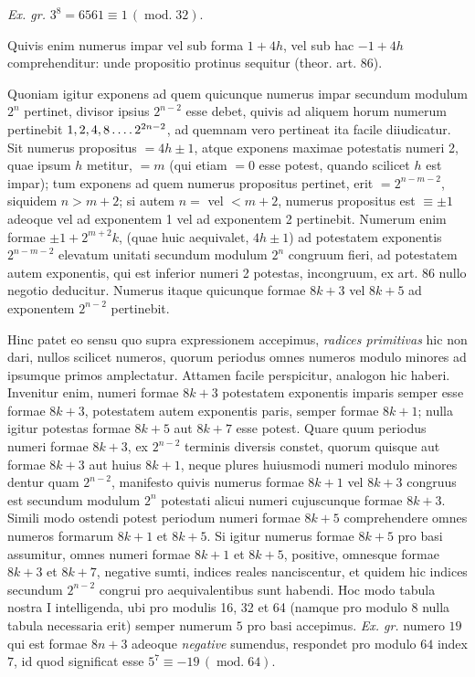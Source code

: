 \emph{Ex. gr.} $3^8=6561\equiv1\,(\operatorname{mod.}32)$.

Quivis enim numerus impar vel sub forma $1+4h$, vel sub hac $-1+4h$ comprehenditur: unde propositio protinus sequitur (theor. art. 86).

Quoniam igitur exponens ad quem quicunque numerus impar secundum modulum $2^n$ pertinet, divisor ipsius $2^{n-2}$ esse debet, quivis ad aliquem horum numerum pertinebit $1,2,4,8\mathinner{.\,.\,.\,.}2^{2n-2}$, ad quemnam vero pertineat ita facile diiudicatur. Sit numerus propositus $=4h\pm1$, atque exponens maximae potestatis numeri 2, quae ipsum $h$ metitur, $=m$ (qui etiam $=0$ esse potest, quando scilicet $h$ est impar); tum exponens ad quem numerus propositus pertinet, erit $=2^{n-m-2}$, siquidem $n>m+2$; si autem $n=$ vel $<m+2$, numerus propositus est $\equiv\pm1$ adeoque vel ad exponentem 1 vel ad exponentem 2 pertinebit. Numerum enim formae $\pm1+2^{m+2}k$, (quae huic aequivalet, $4h\pm1$) ad potestatem exponentis $2^{n-m-2}$ elevatum unitati secundum modulum $2^n$ congruum fieri, ad potestatem autem exponentis, qui est inferior numeri 2 potestas, incongruum, ex art. 86 nullo negotio deducitur. Numerus itaque quicunque formae $8k+3$ vel $8k+5$ ad exponentem $2^{n-2}$ pertinebit.


Hinc patet eo sensu quo supra expressionem accepimus, \emph{radices primitivas} hic non dari, nullos scilicet numeros, quorum periodus omnes numeros modulo minores ad ipsumque primos amplectatur. Attamen facile perspicitur, analogon hic haberi. Invenitur enim, numeri formae $8k+3$ potestatem exponentis imparis semper esse formae $8k+3$, potestatem autem exponentis paris, semper formae $8k+1$; nulla igitur potestas formae $8k+5$ aut $8k+7$ esse potest. Quare quum periodus numeri formae $8k+3$, ex $2^{n-2}$ terminis diversis constet, quorum quisque aut formae $8k+3$ aut huius $8k+1$, neque plures huiusmodi numeri modulo minores dentur quam $2^{n-2}$, manifesto quivis numerus formae $8k+1$ vel $8k+3$ congruus est secundum modulum $2^n$ potestati alicui numeri cujuscunque formae $8k+3$. Simili modo ostendi potest periodum numeri formae $8k+5$ comprehendere omnes numeros formarum $8k+1$ et $8k+5$. Si igitur numerus formae $8k+5$ pro basi assumitur, omnes numeri formae $8k+1$ et $8k+5$, positive, omnesque formae $8k+3$ et $8k+7$, negative sumti, indices reales nanciscentur, et quidem hic indices secundum $2^{n-2}$ congrui pro aequivalentibus sunt habendi. Hoc modo tabula nostra I intelligenda, ubi pro modulis 16, 32 et 64
(namque pro modulo $8$ nulla tabula necessaria erit) semper numerum $5$ pro basi accepimus. \emph{Ex. gr.} numero $19$ qui est formae $8n+3$ adeoque \emph{negative} sumendus, respondet pro modulo $64$ index $7$, id quod significat esse $5^7\equiv-19\,(\operatorname{mod.}64)$.

